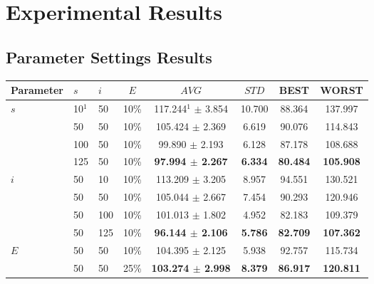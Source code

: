 \chapter{Experimental Results}
\label{appendixC}

\section{Parameter Settings Results}

\begin{table}
    \centering
    \begin{tabular}{|l|l|l|c||c|c|c|c|}
    \hline
    Parameter & $s$ & $i$ & $E$ & $AVG$ & $STD$ & BEST & WORST \\
    \hline
    $s$ & 10$^1$ & 50 & 10\% & 117.244$^1$ $\pm$ 3.854 & 10.700 & 88.364 & 137.997\\
    ~ & 50 & 50 & 10\% & 105.424 $\pm$ 2.369 & 6.619 & 90.076 & 114.843\\
    ~ & 100 & 50 & 10\% & 99.890 $\pm$ 2.193 & 6.128 & 87.178 & 108.688\\
    ~ & 125 & 50 & 10\% & \textbf{97.994 $\pm$ 2.267} & \textbf{6.334} & \textbf{80.484} & \textbf{105.908}\\
    \hline
    $i$ & 50 & 10 & 10\% & 113.209 $\pm$ 3.205 & 8.957 & 94.551 & 130.521\\
    ~ & 50 & 50 & 10\% & 105.044 $\pm$ 2.667 & 7.454 & 90.293 & 120.946\\
    ~ & 50 & 100 & 10\% & 101.013 $\pm$ 1.802 & 4.952 & 82.183 & 109.379\\
    ~ & 50 & 125 & 10\% & \textbf{96.144 $\pm$ 2.106} & \textbf{5.786} & \textbf{82.709} & \textbf{107.362}\\
    \hline
    $E$ & 50 & 50 & 10\% & 104.395 $\pm$ 2.125 & 5.938 & 92.757 & 115.734\\
    ~ & 50 & 50 & 25\% & \textbf{103.274 $\pm$ 2.998} & \textbf{8.379} & \textbf{86.917} & \textbf{120.811}\\

\end{tabular}
\end{table}
